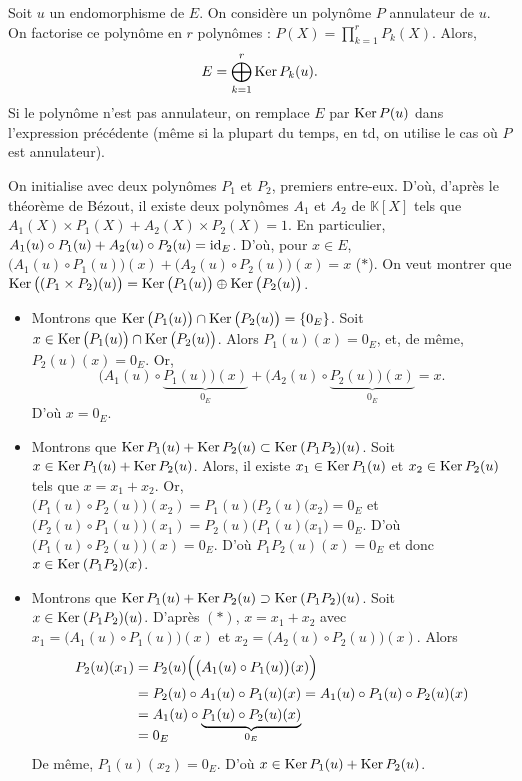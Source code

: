 \begin{lem}
	Soit $u$\/ un endomorphisme de $E$. On considère un polynôme $P$\/ annulateur de $u$.
	On factorise ce polynôme en $r$\/ polynômes : $P(X) = \prod_{k=1}^r P_k(X)$.
	Alors, \[
		E = \bigoplus_{k=1}^r \operatorname{Ker} P_k(u)
	.\]
	Si le polynôme n'est pas annulateur, on remplace $E$\/ par $\operatorname{Ker} P(u)$\/ dans l'expression précédente (même si la plupart du temps, en {\sc td}, on utilise le cas où $P$\/ est annulateur).
\end{lem}

\begin{prv}
	On initialise avec deux polynômes $P_1$\/ et $P_2$, premiers entre-eux.
	D'où, d'après le théorème de {\sc Bézout}, il existe deux polynômes $A_1$\/ et $A_2$\/ de $\mathds{K}[X]$\/ tels que $A_1(X)\times P_1(X) + A_2(X)\times P_2(X) = 1$. En particulier, $A_1(u)  \circ P_1(u) + A_2(u)  \circ P_2(u) = \operatorname{id}_E$.
	D'où, pour $x \in E$, $\big(A_1(u)  \circ P_1(u)\big)(x) + \big(A_2(u)  \circ P_2(u)\big)(x) = x$\/ ($*$).
	On veut montrer que $\operatorname{Ker}\big((P_1\times P_2)(u)\big) = \operatorname{Ker}\big(P_1(u)\big) \oplus \operatorname{Ker}\big(P_2(u)\big)$.
	\begin{itemize}
		\item Montrons que $\operatorname{Ker}\big(P_1(u)\big) \cap \operatorname{Ker}\big(P_2(u)\big) = \{0_E\}$.
			Soit $x \in \operatorname{Ker}\big(P_1(u)\big) \cap \operatorname{Ker}\big(P_2(u)\big)$. Alors $P_1(u)(x) = 0_E$, et, de même, $P_2(u)(x) = 0_E$. Or, \[
				\big(A_1(u)  \circ \underbrace{P_1(u)\big)(x)}_{0_E} + \big(A_2(u)  \circ \underbrace{P_2(u)\big)(x)}_{0_E} = x
			.\] D'où $x = 0_E$.
		\item Montrons que $\operatorname{Ker} P_1(u) + \operatorname{Ker} P_2(u) \subset \operatorname{Ker}\:(P_1P_2)(u)$.
			Soit $x \in \operatorname{Ker} P_1(u) + \operatorname{Ker} P_2(u)$. Alors, il existe $x_1 \in \operatorname{Ker} P_1(u)$\/ et $x_2 \in \operatorname{Ker} P_2(u)$\/ tels que $x = x_1 + x_2$.
			Or, $\big(P_1(u)  \circ P_2(u)\big) (x_2) = P_1(u)\big(P_2(u)(x_2\big) = 0_E$\/ et $\big(P_2(u)  \circ P_1(u)\big) (x_1) = P_2(u)\big(P_1(u)(x_1\big) = 0_E$.
			D'où $\big(P_1(u)  \circ P_2(u)\big) (x) = 0_E$.
			D'où $P_1P_2(u)(x) = 0_E$\/ et donc $x \in \operatorname{Ker}\:(P_1P_2)(x)$.
		\item Montrons que $\operatorname{Ker} P_1(u) + \operatorname{Ker} P_2(u) \supset \operatorname{Ker}\:(P_1P_2)(u)$.
			Soit $x \in \operatorname{Ker}\:(P_1P_2)(u)$. D'après $(*)$, $x = x_1 + x_2$\/ avec $x_1 = \big(A_1(u)  \circ P_1(u)\big)(x)$\/ et $x_2 = \big(A_2(u)  \circ P_2(u)\big)(x)$.
			Alors
			\begin{align*}
				P_2(u)(x_1) &= P_2(u)\Big(\big(A_1(u) \circ P_1(u)\big)(x)\Big)\\
				&= P_2(u) \circ A_1(u) \circ P_1(u)(x) = A_1(u) \circ P_1(u)  \circ P_2(u)(x)\\
				&= A_1(u) \circ\smash{\underbrace{P_1(u)  \circ P_2(u)(x)}_{0_E}} \\
				&= 0_E \\
			\end{align*}
			De même, $P_1(u)(x_2) = 0_E$.
			D'où $x \in \operatorname{Ker} P_1(u) + \operatorname{Ker} P_2(u)$.
	\end{itemize}
\end{prv}

